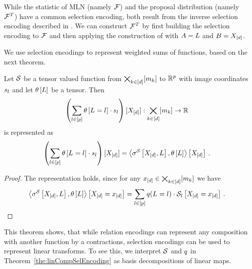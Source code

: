 \begin{example}
    While the statistic of MLN (namely $\mathcal{F}$) and the proposal distribution (namely $\mathcal{F}^T$) have a common selection encoding, both result from the inverse selection encoding described in .
    We can construct $\mathcal{F}^T$ by first building the selection encoding to $\mathcal{F}$ and then applying the construction of  with $A=L$ and $B=X_{[d]}$.
\end{example}


We use selection encodings to represent weighted sums of functions, based on the next theorem.

\begin{theorem}
    \label{the:linCompSelEncoding}
    Let $\mathcal{S}$ be a tensor valued function from $\bigtimes_{k\in[d]}[m_{k}]$ to $\mathbb{R}^{p}$ with image coordinates $s_{l}$ and let $\theta\left[L\right]$ be a tensor.
    Then
    \[ \left(\sum_{l\in[p]}\theta\left[L_{}=l_{}\right] \cdot s_{l} \right) [X_{[d]}] : \bigtimes_{k\in[d]}[m_{k}] \rightarrow \mathbb{R} \]
    is represented as
    \[ \left(\sum_{l\in[p]}\theta\left[L_{}=l_{}\right]\cdot s_{l} \right) [X_{[d]}]
    = \left\langle \sigma^{\mathcal{S}}\left[X_{[d]},L\right] , \theta\left[L\right]\right\rangle \left[ X_{[d]} \right] \, . \]
\end{theorem}
\begin{proof}
    The representation holds, since for any $x_{[d]}\in\bigtimes_{k\in[d]}[m_{k}]$ we have
    \begin{align*}
        \left\langle \sigma^{\mathcal{S}}\left[X_{[d]},L\right],\theta\left[L\right]\right\rangle \left[ X_{[d]}=x_{[d]} \right]
        = \sum_{l\in[p]}q(L_{}=l_{})\cdot\mathcal{S}_{l}\left[X_{[d]}=x_{[d]}\right] \, .
    \end{align*}
\end{proof}

This theorem shows, that while relation encodings can represent any composition with another function by a contractions, selection encodings can be used to represent linear transforms.
To see this, we interpret $\mathcal{S}$ and $q$ in Theorem~\ref{the:linCompSelEncoding} as basis decompositions of linear maps.


